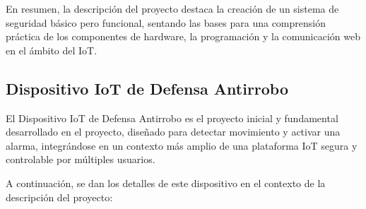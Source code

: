 \documentclass{report}
\begin{document}
En resumen, la descripción del proyecto destaca la creación de un sistema de seguridad básico pero funcional, sentando las bases para una comprensión práctica 
de los componentes de hardware, la programación y la comunicación web en el ámbito del IoT.

\subsection{Dispositivo IoT de Defensa Antirrobo}
El Dispositivo IoT de Defensa Antirrobo es el proyecto inicial y fundamental desarrollado en el proyecto, diseñado para detectar movimiento y activar una 
alarma, integrándose en un contexto más amplio de una plataforma IoT segura y controlable por múltiples usuarios.

A continuación, se dan los detalles de este dispositivo en el contexto de la descripción del proyecto:
\end{document}
